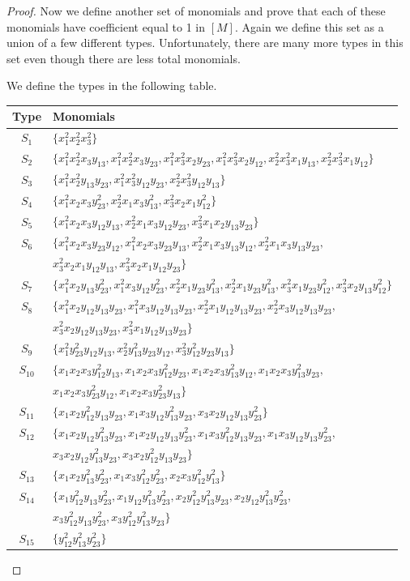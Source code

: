 \documentclass[12pt]{article}
\theoremstyle{plain}
\theoremstyle{definition}
\begin{document}
\begin{proof}
Now we define another set of monomials and prove that each of these monomials have coefficient equal to 1 in $[M]$. Again we define this set as a union of a few different types. Unfortunately, there are many more types in this set even though there are less total monomials. 

We define the types in the following table.

\begin{longtable}{|c|l|}
\hline
Type & Monomials\\
\hline
$S_1$ & $\{x_1^2x_2^2x_3^2\}$\\
\hline
$S_2$ & $\{x_1^2x_2^2x_3y_{13},x_1^2x_2^2x_3y_{23},x_1^2x_3^2x_2y_{23},x_1^2x_3^2x_2y_{12}, x_2^2x_3^2x_1y_{13},x_2^2x_3^2x_1y_{12}\}$\\
\hline   
$S_3$ & $\{x_1^2x_2^2y_{13}y_{23},x_1^2x_3^2y_{12}y_{23},x^2_2x_3^2y_{12}y_{13}\}$\\
\hline
$S_4$ & $\{ x_1^2x_2x_3y_{23}^2,x_2^2x_1x_3y_{13}^2,x_3^2x_2x_1y_{12}^2\}$\\
\hline
$S_5$ & $\{ x_1^2x_2x_3y_{12}y_{13},x_2^2x_1x_3y_{12}y_{23},x_3^2x_1x_2y_{13}y_{23}\}$\\
\hline
$S_6$ & $\{ x_1^2x_2x_3y_{23}y_{12},x_1^2x_2x_3y_{23}y_{13},x_2^2x_1x_3y_{13}y_{12},x_2^2x_1x_3y_{13}y_{23},$ \\
& $x_3^2x_2x_1y_{12}y_{13},x_3^2x_2x_1y_{12}y_{23}\}$\\
\hline
$S_7$ & $\{ x_1^2x_2y_{13}y_{23}^2,x_1^2x_3y_{12}y_{23}^2,x_2^2x_1y_{23}y_{13}^2,x_2^2x_1y_{23}y_{13}^2,x_3^2x_1y_{23}y_{12}^2,x_3^2x_2y_{13}y_{12}^2\}$\\
\hline
$S_8$ & $\{ x_1^2x_2y_{12}y_{13}y_{23},x_1^2x_3y_{12}y_{13}y_{23}, x_2^2x_1y_{12}y_{13}y_{23},x_2^2x_3y_{12}y_{13}y_{23},$\\
& $x_3^2x_2y_{12}y_{13}y_{23},x_3^2x_1y_{12}y_{13}y_{23}\}$\\
\hline
$S_9$ & $\{x_1^2y_{23}^2y_{12}y_{13},x_2^2y_{13}^2y_{23}y_{12},x_3^2y_{12}^2y_{23}y_{13}\}$ \\
\hline
$S_{10}$ & $\{ x_1x_2x_3y_{12}^2y_{13},x_1x_2x_3y_{12}^2y_{23},x_1x_2x_3y_{13}^2y_{12},x_1x_2x_3y_{13}^2y_{23},$\\
& $x_1x_2x_3y_{23}^2y_{12},x_1x_2x_3y_{23}^2y_{13}\}$\\
\hline
$S_{11}$ & $\{ x_1x_2y_{12}^2y_{13}y_{23},x_1x_3y_{12}y_{13}^2y_{23},x_3x_2y_{12}y_{13}y_{23}^2\}$\\
\hline
$S_{12}$& $\{x_1x_2y_{12}y_{13}^2y_{23},x_1x_2y_{12}y_{13}y_{23}^2,x_1x_3y_{12}^2y_{13}y_{23},x_1x_3y_{12}y_{13}y_{23}^2,$\\
& $x_3x_2y_{12}y_{13}^2y_{23},x_3x_2y_{12}^2y_{13}y_{23} \}$\\
\hline
$S_{13}$ & $\{ x_1x_2y_{13}^2y_{23}^2,x_1x_3y_{12}^2y_{23}^2,x_2x_3y_{12}^2y_{13}^2\}$\\
\hline
$S_{14}$ & $ \{ x_1y_{12}^2y_{13}y_{23}^2,x_1y_{12}y_{13}^2y_{23}^2, x_2y_{12}^2y_{13}^2y_{23},x_2y_{12}y_{13}^2y_{23}^2, $\\
& $x_3y_{12}^2y_{13}y_{23}^2,x_3y_{12}^2y_{13}^2y_{23}\}$\\
\hline
$S_{15}$ & $\{y_{12}^2y_{13}^2y_{23}^2\}$\\
\hline
\end{longtable}


\end{proof}
\end{document}
